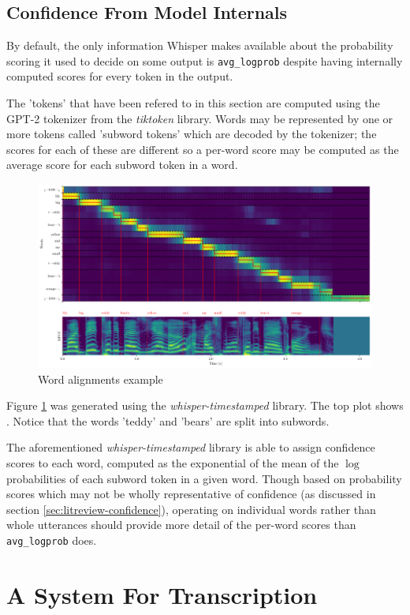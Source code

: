 \subsection{Confidence From Model Internals}

By default, the only information Whisper makes available about the probability scoring it used to decide on some output is \texttt{avg\_logprob} despite having internally computed scores for every token in the output.

The 'tokens' that have been refered to in this section are computed using the GPT-2 tokenizer from the \emph{tiktoken} library\cite{tiktoken}.
Words may be represented by one or more tokens called 'subword tokens' which are decoded by the tokenizer; the scores for each of these are different so a per-word score may be computed as the average score for each subword token in a word.

\begin{figure}[h]
  \centering
  \includegraphics[width=\textwidth]{images/mfcc-with-words.png}
  \caption{Word alignments example}
  \label{fig:word-alignments-example}
\end{figure}

Figure \ref{fig:word-alignments-example} was generated using the \emph{whisper-timestamped} library\cite{whisper-timestamped, whisper-ts-dtw-paper, whisper}.
The top plot shows \cite{whisper-timestamped}.
Notice that the words 'teddy' and 'bears' are split into subwords.

The aforementioned \emph{whisper-timestamped} library is able to assign confidence scores to each word, computed as the exponential of the mean of the $\log$ probabilities of each subword token in a given word.
Though based on probability scores which may not be wholly representative of confidence (as discussed in section \ref{sec:litreview-confidence}), operating on individual words rather than whole utterances should provide more detail of the per-word scores than \texttt{avg\_logprob} does.

\section{A System For Transcription}
